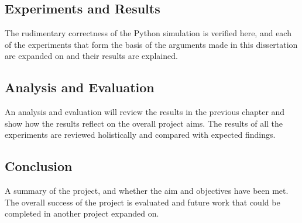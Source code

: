 \subsection*{Experiments and Results}
The rudimentary correctness of the Python simulation is verified here, and each
of the experiments that form the basis of the arguments made in this
dissertation are expanded on and their results are explained.

\subsection*{Analysis and Evaluation}
An analysis and evaluation will review the results in the previous chapter and
show how the results reflect on the overall project aims. The results of all the experiments are reviewed holistically and compared with
expected findings.
\subsection*{Conclusion}
A summary of the project, and whether the aim and objectives have been met. The
overall success of the project is evaluated and future work that could be
completed in another project expanded on.